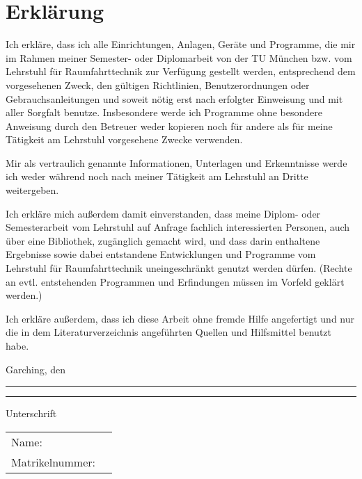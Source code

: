 \cleardoublepage
\section*{Erkl\"{a}rung}
Ich erkläre, dass ich alle Einrichtungen, Anlagen, Geräte und Programme, die mir im Rahmen meiner Semester- oder Diplomarbeit von der TU München bzw. vom Lehrstuhl für Raumfahrttechnik zur Verfügung gestellt werden, entsprechend dem vorgesehenen Zweck, den gültigen Richtlinien, Benutzerordnungen oder Gebrauchsanleitungen und soweit nötig erst nach erfolgter Einweisung und mit aller Sorgfalt benutze. Insbesondere werde ich Programme ohne besondere Anweisung durch den Betreuer weder kopieren noch für andere als für meine Tätigkeit am Lehrstuhl vorgesehene Zwecke verwenden.

Mir als vertraulich genannte Informationen, Unterlagen und Erkenntnisse werde ich weder während noch nach meiner Tätigkeit am Lehrstuhl an Dritte weitergeben.

Ich erkläre mich außerdem damit einverstanden, dass meine Diplom- oder Semesterarbeit vom Lehrstuhl auf Anfrage fachlich interessierten Personen, auch über eine Bibliothek, zugänglich gemacht wird, und dass darin enthaltene Ergebnisse sowie dabei entstandene Entwicklungen und Programme vom Lehrstuhl für Raumfahrttechnik uneingeschränkt genutzt werden dürfen. (Rechte an evtl. entstehenden Programmen und Erfindungen müssen im Vorfeld geklärt werden.)

Ich erkläre außerdem, dass ich diese Arbeit ohne fremde Hilfe angefertigt und nur die in dem Literaturverzeichnis angeführten Quellen und Hilfsmittel benutzt habe.

\vspace{24pt}

Garching, den \rule{3cm}{0.5pt}

\vspace{36pt}
\rule{8cm}{0.5pt}\newline
Unterschrift

\vspace{24pt}
\setlength{\tabcolsep}{0pt}
\begin{table}[h!]
	\begin{tabularx}{\linewidth}{p{3.5cm} X}
		Name:			& \theauthor \\
		Matrikelnummer:	& \matrikel
	\end{tabularx}
\end{table}
\setlength{\tabcolsep}{2pt}